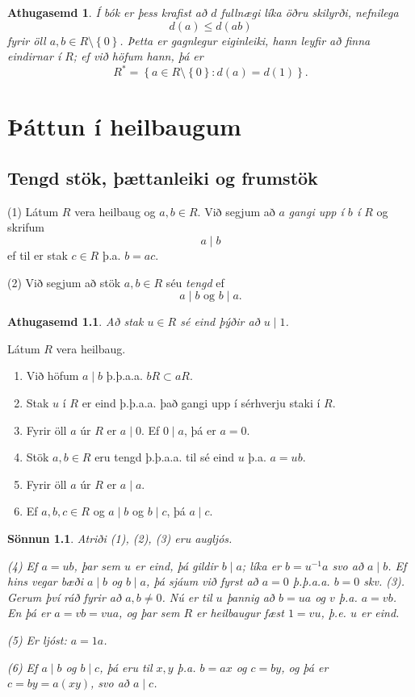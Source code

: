 \documentclass[a4paper,icelandic,11pt]{book}
\theoremstyle{plain}
\newtheorem*{ath}{Athugasemd}
\newtheorem*{sonnun}{Sönnun}
\begin{document}
\begin{ath}
  Í bók er þess krafist að $d$ fullnægi líka öðru skilyrði, nefnilega\[
  d(a) \leq d(ab)
  \]
  fyrir öll $a,b\in R\setminus\left\{ 0 \right\}$. Þetta er gagnlegur
  eiginleiki, hann leyfir að finna eindirnar í $R$; ef við höfum hann, þá er\[
  R^* = \left\{ a\in R\setminus\left\{ 0 \right\}: d(a)=d(1) \right\}.
  \]
\end{ath}


\chapter{Þáttun í heilbaugum}

\section{Tengd stök, þættanleiki og frumstök}
\begin{skilgr}
  (1) Látum $R$ vera heilbaug og $a,b\in R$. Við segjum að $a$ \emph{gangi upp
  í $b$ í $R$} og skrifum\[
  a \mid b
  \]
  ef til er stak $c\in R$ þ.a. $b=ac$.

  (2) Við segjum að stök $a,b\in R$ séu \emph{tengd} ef
  \[ a\mid b \text{ og } b\mid a . \]
\end{skilgr}
\begin{ath}
  Að stak $u\in R$ sé eind þýðir að $u\mid 1$.
\end{ath}
\begin{setn}
  Látum $R$ vera heilbaug.
  \begin{enumerate}[(1)]
    \item Við höfum $a\mid b$ þ.þ.a.a. $bR\subset aR$.
    \item Stak $u$ í $R$ er eind þ.þ.a.a. það gangi upp í sérhverju staki í
      $R$.
    \item Fyrir öll $a$ úr $R$ er $a\mid 0$. Ef $0\mid a$, þá er $a=0$.
    \item Stök $a,b\in R$ eru tengd þ.þ.a.a. til sé eind $u$ þ.a. $a=ub$.
    \item Fyrir öll $a$ úr $R$ er $a\mid a$.
    \item Ef $a,b,c\in R$ og $a\mid b$ og $b\mid c$, þá $a\mid c$. 
  \end{enumerate}
\end{setn}
\begin{sonnun}
  Atriði (1), (2), (3) eru augljós.

  (4) Ef $a = ub$, þar sem $u$ er eind, þá gildir $b\mid a$; líka er $b=u^{-1}a$ svo
  að $a\mid b$. Ef hins vegar bæði $a\mid b$ og $b\mid a$, þá sjáum við fyrst að $a=0$
  þ.þ.a.a. $b=0$ skv. (3). Gerum því ráð fyrir að $a,b\neq 0$. Nú er til $u$
  þannig að $b=ua$ og $v$ þ.a. $a = vb$. En þá er $a=vb=vua$, og þar sem $R$ er
  heilbaugur fæst $1=vu$, þ.e. $u$ er eind.

  (5) Er ljóst: $a=1a$.
  
  (6) Ef $a\mid b$ og $b\mid c$, þá eru til $x,y$ þ.a. $b=ax$ og $c=by$, og þá er
  $c=by=a(xy)$, svo að $a\mid c$.
\end{sonnun}
\end{document}
